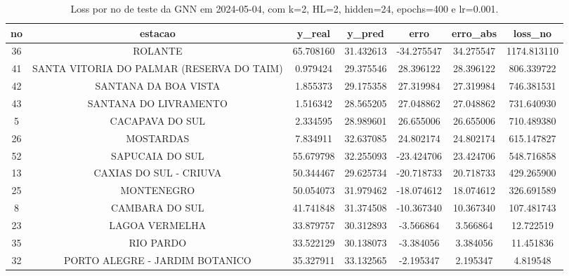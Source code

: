 \begin{table}[h]
\centering
\caption{Loss por no de teste da GNN em 2024-05-04, com k=2, HL=2, hidden=24, epochs=400 e lr=0.001.}
\label{tab:gnn_loss_k2_hl2_h24_e400_d20240504}
\begin{tabular}{ccccccc}
\toprule
no & estacao & y\_real & y\_pred & erro & erro\_abs & loss\_no \\
\midrule
36 & ROLANTE & 65.708160 & 31.432613 & -34.275547 & 34.275547 & 1174.813110 \\
41 & SANTA VITORIA DO PALMAR (RESERVA DO TAIM) & 0.979424 & 29.375546 & 28.396122 & 28.396122 & 806.339722 \\
42 & SANTANA DA BOA VISTA & 1.855373 & 29.175358 & 27.319984 & 27.319984 & 746.381531 \\
43 & SANTANA DO LIVRAMENTO & 1.516342 & 28.565205 & 27.048862 & 27.048862 & 731.640930 \\
5 & CACAPAVA DO SUL & 2.334595 & 28.989601 & 26.655006 & 26.655006 & 710.489380 \\
26 & MOSTARDAS & 7.834911 & 32.637085 & 24.802174 & 24.802174 & 615.147827 \\
52 & SAPUCAIA DO SUL & 55.679798 & 32.255093 & -23.424706 & 23.424706 & 548.716858 \\
13 & CAXIAS DO SUL - CRIUVA & 50.344467 & 29.625734 & -20.718733 & 20.718733 & 429.265900 \\
25 & MONTENEGRO & 50.054073 & 31.979462 & -18.074612 & 18.074612 & 326.691589 \\
8 & CAMBARA DO SUL & 41.741848 & 31.374508 & -10.367340 & 10.367340 & 107.481743 \\
23 & LAGOA VERMELHA & 33.879757 & 30.312893 & -3.566864 & 3.566864 & 12.722519 \\
35 & RIO PARDO & 33.522129 & 30.138073 & -3.384056 & 3.384056 & 11.451836 \\
32 & PORTO ALEGRE - JARDIM BOTANICO & 35.327911 & 33.132565 & -2.195347 & 2.195347 & 4.819548 \\
\bottomrule
\end{tabular}
\end{table}
